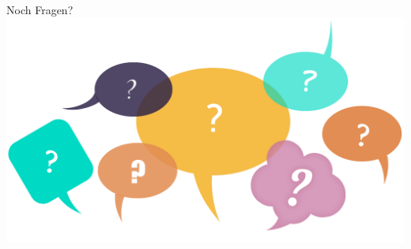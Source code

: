 \documentclass[12pt, xcolor={usenames,dvipsnames,svgnames,x11names,table}]{beamer}
\begin{document}
	
	\section{}
	\begin{frame}{Noch Fragen?}
		\includegraphics[width=\textwidth]{fragen}
	\end{frame}
\end{document}
